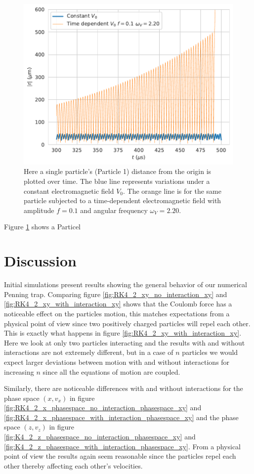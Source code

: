\documentclass[english,notitlepage,reprint,nofootinbib]{revtex4-1}  %
\begin{document}
\begin{figure}[H]
    \centering
    \includegraphics[width=.5\textwidth]{../figures/ressonance_p1_norm_f0.10_omega_2.20_x_500.pdf}
    \caption{Here a single particle's (Particle 1) distance from the origin is plotted over time. The blue line represents variations under a constant electromagnetic field $V_0$. The orange line is for the same particle subjected to a time-dependent electromagnetic field with amplitude $f = 0.1$ and angular frequency $\omega_V = 2.20$.}
    \label{fig:ressonance_p1_norm_f0}
\end{figure}

Figure \ref{fig:ressonance_p1_norm_f0} shows a Particel  


\section{Discussion}\label{sec:discussion}

Initial simulations present results showing the general behavior of our numerical Penning trap.
Comparing figure \ref{fig:RK4_2_xy_no_interaction_xy} and \ref{fig:RK4_2_xy_with_interaction_xy} shows that the Coulomb force has a noticeable effect on
the particles motion, this matches expectations from a physical point of view since two positively charged particles will repel each other. This is exactly what happens in figure \ref{fig:RK4_2_xy_with_interaction_xy}. Here we look at only two particles interacting and the results with and without interactions are not extremely different,
but in a case of $n$ particles we would expect larger deviations between motion with and without interactions for increasing $n$ since all the equations of motion are coupled.

Similarly, there are noticeable differences with and without interactions for the phase space $(x, v_x)$ in figure \ref{fig:RK4_2_x_phasespace_no_interaction_phasespace_xy}
and \ref{fig:RK4_2_x_phasespace_with_interaction_phasespace_xy} and the phase space $(z, v_z)$ in figure \ref{fig:K4_2_z_phasespace_no_interaction_phasespace_xy}
and \ref{fig:K4_2_z_phasespace_with_interaction_phasespace_xy}. From a physical point of view the results again seem reasonable since the particles
repel each other thereby affecting each other's velocities.
\end{document}
